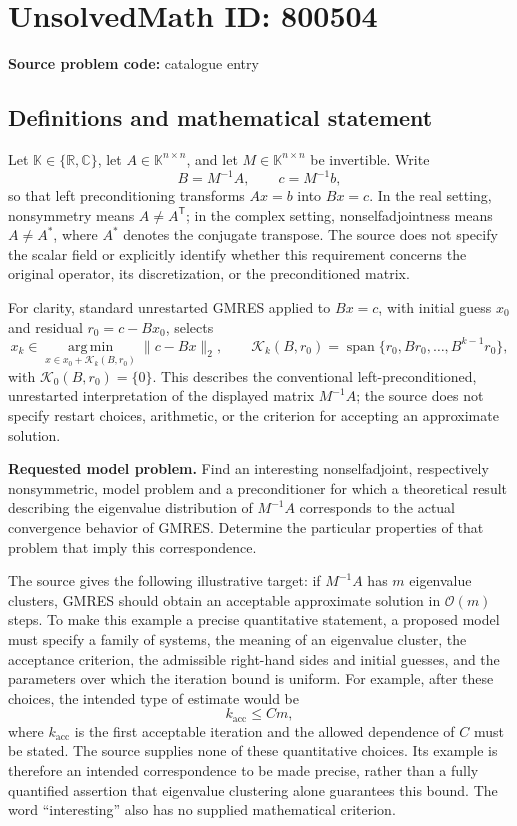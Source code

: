 \documentclass[11pt]{article}
\newcommand{\R}{\mathbb{R}}
\newcommand{\C}{\mathbb{C}}
\begin{document}
\section*{UnsolvedMath ID: 800504}
\textbf{Source problem code:} catalogue entry
\subsection{Definitions and mathematical statement}
Let \(\mathbb K\in\{\R,\C\}\), let \(A\in\mathbb K^{n\times n}\), and let \(M\in\mathbb K^{n\times n}\) be invertible. Write
\[
B=M^{-1}A,\qquad c=M^{-1}b,
\]
so that left preconditioning transforms \(Ax=b\) into \(Bx=c\). In the real setting, nonsymmetry means \(A\ne A^{\mathsf T}\); in the complex setting, nonselfadjointness means \(A\ne A^*\), where \(A^*\) denotes the conjugate transpose. The source does not specify the scalar field or explicitly identify whether this requirement concerns the original operator, its discretization, or the preconditioned matrix.

For clarity, standard unrestarted GMRES applied to \(Bx=c\), with initial guess \(x_0\) and residual \(r_0=c-Bx_0\), selects
\[
x_k\in\operatorname*{arg\,min}_{x\in x_0+\mathcal K_k(B,r_0)}\|c-Bx\|_2,
\qquad
\mathcal K_k(B,r_0)=\operatorname{span}\{r_0,Br_0,\ldots,B^{k-1}r_0\},
\]
with \(\mathcal K_0(B,r_0)=\{0\}\). This describes the conventional left-preconditioned, unrestarted interpretation of the displayed matrix \(M^{-1}A\); the source does not specify restart choices, arithmetic, or the criterion for accepting an approximate solution.

\textbf{Requested model problem.} Find an interesting nonselfadjoint, respectively nonsymmetric, model problem and a preconditioner for which a theoretical result describing the eigenvalue distribution of \(M^{-1}A\) corresponds to the actual convergence behavior of GMRES. Determine the particular properties of that problem that imply this correspondence.

The source gives the following illustrative target: if \(M^{-1}A\) has \(m\) eigenvalue clusters, GMRES should obtain an acceptable approximate solution in \(\mathcal O(m)\) steps. To make this example a precise quantitative statement, a proposed model must specify a family of systems, the meaning of an eigenvalue cluster, the acceptance criterion, the admissible right-hand sides and initial guesses, and the parameters over which the iteration bound is uniform. For example, after these choices, the intended type of estimate would be
\[
k_{\mathrm{acc}}\le C m,
\]
where \(k_{\mathrm{acc}}\) is the first acceptable iteration and the allowed dependence of \(C\) must be stated. The source supplies none of these quantitative choices. Its example is therefore an intended correspondence to be made precise, rather than a fully quantified assertion that eigenvalue clustering alone guarantees this bound. The word ``interesting'' also has no supplied mathematical criterion.
\end{document}
